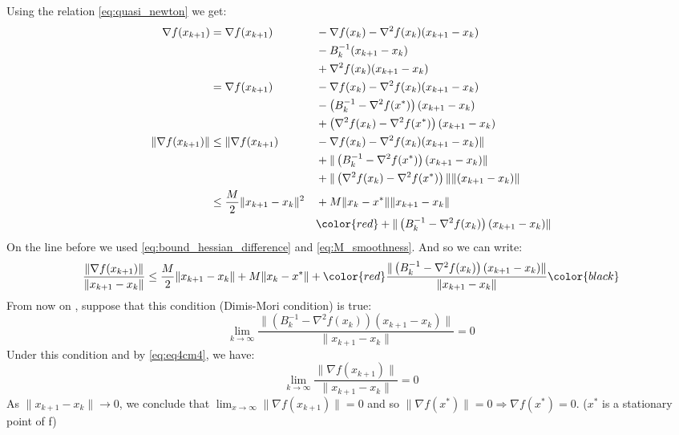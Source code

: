 \documentclass[12pt, openany]{report}
\theoremstyle{definition}
\begin{document}
Using the relation \eqref{eq:quasi_newton} we get:
\begin{equation}
	\begin{aligned}
		\nabla f(x_{k+1}) &= \nabla f(x_{k+1}) &&- \nabla f(x_k)- \nabla^2 f(x_k) (x_{k+1}-x_k)\\ 
		& &&- B_k^{-1}  (x_{k+1}-x_k)\\ 
		& &&+ \nabla^2 f(x_k) (x_{k+1}-x_k)\\
		&= \nabla f(x_{k+1})  &&- \nabla f(x_k) - \nabla^2 f(x_k) (x_{k+1}-x_k)\\
		& &&- \left(B_k^{-1} - \nabla^2 f(x^*)\right) (x_{k+1}-x_k)\\
		& &&+ \left( \nabla^2 f(x_k) - \nabla^2 f(x^*)\right) (x_{k+1}-x_k)\\
		\|\nabla f(x_{k+1})\| &\leq \|\nabla f(x_{k+1})  &&- \nabla f(x_k) - \nabla^2 f(x_k) (x_{k+1}-x_k) \| \\
		& &&+ \|\left(B_k^{-1} - \nabla^2 f(x^*)\right) (x_{k+1}-x_k)\|\\
		& &&+ \|\left( \nabla^2 f(x_k) - \nabla^2 f(x^*)\right) \| \|(x_{k+1}-x_k)\|\\ 
		&\leq \frac{M}{2} \|x_{k+1}-x_k\|^2 &&+ M \|x_k-x^*\| \|x_{k+1}-x_k\|\\
		& &&\color{red}+ \|\left(B_k^{-1}-\nabla^2f(x_k)\right)(x_{k+1}-x_k)\|
	\end{aligned}
\end{equation}
On the line before we used \eqref{eq:bound_hessian_difference} and \eqref{eq:M_smoothness}. And so we can write:
\begin{equation}\label{eq:eq4cm4}
	\frac{\|\nabla f(x_{k+1})\|}{\|x_{k+1}-x_k\|} \leq \frac{M}{2} \|x_{k+1}-x_k\| + M \|x_k - x^* \| + \color{red} \frac{\|\left(B_k^{-1}-\nabla^2f(x_k)\right)(x_{k+1}-x_k)\|}{\|x_{k+1}-x_k\|}\color{black}
\end{equation}
From now on , suppose that this condition (Dimis-Mori condition) is true:
\begin{equation}\label{eq:dimis_mori_condition}
	\lim_{k\to \infty} \frac{\|\left(B_k^{-1}-\nabla^2f(x_k)\right)(x_{k+1}-x_k)\|}{\|x_{k+1}-x_k\|} = 0
\end{equation}
Under this condition and by \eqref{eq:eq4cm4}, we have:
\begin{equation}
	\lim_{k \to \infty} \frac{\|\nabla f(x_{k+1})\|}{\|x_{k+1}-x_k\|} = 0
\end{equation}
As $\|x_{k+1}-x_k\| \to 0$, we conclude that $\lim_{x \to \infty} \|\nabla f(x_{k+1})\| = 0$ and so $\|\nabla f(x^*)\| = 0 \Rightarrow \nabla f(x^*) = 0$. ($x^*$ is a stationary point of f)\\
\end{document}
